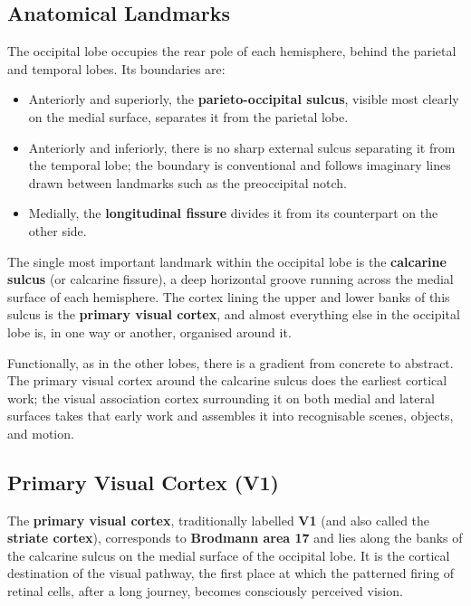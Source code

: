 \documentclass[11pt]{article}
\begin{document}
\subsection{Anatomical Landmarks}

The occipital lobe occupies the rear pole of each hemisphere, behind the parietal and temporal lobes. Its boundaries are:

\begin{itemize}
    \item Anteriorly and superiorly, the \textbf{parieto-occipital sulcus}, visible most clearly on the medial surface, separates it from the parietal lobe.
    \item Anteriorly and inferiorly, there is no sharp external sulcus separating it from the temporal lobe; the boundary is conventional and follows imaginary lines drawn between landmarks such as the preoccipital notch.
    \item Medially, the \textbf{longitudinal fissure} divides it from its counterpart on the other side.
\end{itemize}

The single most important landmark within the occipital lobe is the \textbf{calcarine sulcus} (or calcarine fissure), a deep horizontal groove running across the medial surface of each hemisphere. The cortex lining the upper and lower banks of this sulcus is the \textbf{primary visual cortex}, and almost everything else in the occipital lobe is, in one way or another, organised around it.

Functionally, as in the other lobes, there is a gradient from concrete to abstract. The primary visual cortex around the calcarine sulcus does the earliest cortical work; the visual association cortex surrounding it on both medial and lateral surfaces takes that early work and assembles it into recognisable scenes, objects, and motion.

\subsection{Primary Visual Cortex (V1)}

The \textbf{primary visual cortex}, traditionally labelled \textbf{V1} (and also called the \textbf{striate cortex}), corresponds to \textbf{Brodmann area 17} and lies along the banks of the calcarine sulcus on the medial surface of the occipital lobe. It is the cortical destination of the visual pathway, the first place at which the patterned firing of retinal cells, after a long journey, becomes consciously perceived vision.
\end{document}
